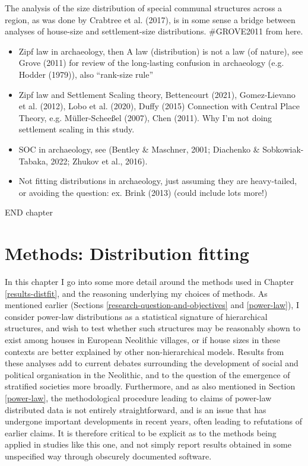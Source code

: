 \documentclass[
  12pt,
]{book}
\begin{document}
The analysis of the size distribution of special communal structures across a region, as was done by Crabtree et al. (2017), is in some sense a bridge between analyses of house-size and settlement-size distributions. \#GROVE2011 from here.

\begin{itemize}
\item
  Zipf law in archaeology, then A law (distribution) is not a law (of nature), see Grove (2011) for review of the long-lasting confusion in archaeology (e.g. Hodder (1979)), also ``rank-size rule''
\item
  Zipf law and Settlement Scaling theory, Bettencourt (2021), Gomez-Lievano et al. (2012), Lobo et al. (2020), Duffy (2015) Connection with Central Place Theory, e.g. Müller-Scheeßel (2007), Chen (2011). Why I'm not doing settlement scaling in this study.
\item
  SOC in archaeology, see (Bentley \& Maschner, 2001; Diachenko \& Sobkowiak-Tabaka, 2022; Zhukov et al., 2016).
\item
  Not fitting distributions in archaeology, just assuming they are heavy-tailed, or avoiding the question: ex. Brink (2013) (could include lots more!)
\end{itemize}

END chapter

\hypertarget{methods-distfit}{%
\chapter{Methods: Distribution fitting}\label{methods-distfit}}

In this chapter I go into some more detail around the methods used in Chapter \ref{results-distfit}, and the reasoning underlying my choices of methods. As mentioned earlier (Sections \ref{research-question-and-objectives} and \ref{power-law}), I consider power-law distributions as a statistical signature of hierarchical structures, and wish to test whether such structures may be reasonably shown to exist among houses in European Neolithic villages, or if house sizes in these contexts are better explained by other non-hierarchical models. Results from these analyses add to current debates surrounding the development of social and political organisation in the Neolithic, and to the question of the emergence of stratified societies more broadly. Furthermore, and as also mentioned in Section \ref{power-law}, the methodological procedure leading to claims of power-law distributed data is not entirely straightforward, and is an issue that has undergone important developments in recent years, often leading to refutations of earlier claims. It is therefore critical to be explicit as to the methods being applied in studies like this one, and not simply report results obtained in some unspecified way through obscurely documented software.
\end{document}
